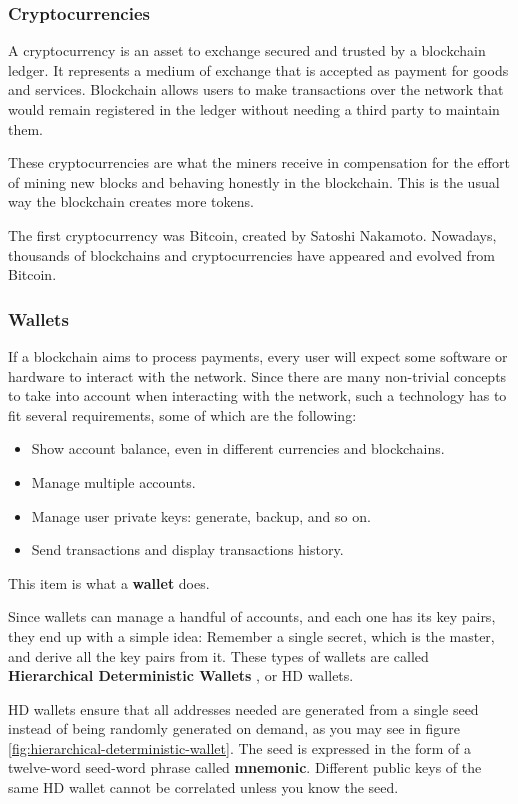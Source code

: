 \subsubsection{Cryptocurrencies}
{A cryptocurrency is an asset to exchange secured and trusted by a blockchain ledger. It represents a medium of exchange that is accepted as payment for goods and services. Blockchain allows users to make transactions over the network that would remain registered in the ledger without needing a third party to maintain them.

These cryptocurrencies are what the miners receive in compensation for the effort of mining new blocks and behaving honestly in the blockchain. This is the usual way the blockchain creates more tokens.

The first cryptocurrency was Bitcoin, created by Satoshi Nakamoto\cite{sathoshi}. Nowadays, thousands of blockchains and cryptocurrencies have appeared and evolved from Bitcoin.  }

\subsubsection{Wallets} \label{section:wallets}
{If a blockchain aims to process payments, every user will expect some software or hardware to interact with the network. Since there are many non-trivial concepts to take into account when interacting with the network, such a technology has to fit several requirements, some of which are the following: }
\begin{itemize}
    \item Show account balance, even in different currencies and blockchains.
    \item Manage multiple accounts.
    \item Manage user private keys: generate, backup, and so on.
    \item Send transactions and display transactions history.
\end{itemize}

{This item is what a \textbf{wallet} does.

Since wallets can manage a handful of accounts, and each one has its key pairs, they end up with a simple idea: Remember a single secret, which is the master, and derive all the key pairs from it. These types of wallets are called \textbf{Hierarchical Deterministic Wallets} \cite{hd-wallet}, or HD wallets. 

HD wallets ensure that all addresses needed are generated from a single seed instead of being randomly generated on demand, as you may see in figure \ref{fig:hierarchical-deterministic-wallet}. The seed is expressed in the form of a twelve-word seed-word phrase called \textbf{mnemonic}. Different public keys of the same HD wallet cannot be correlated unless you know the seed.}

